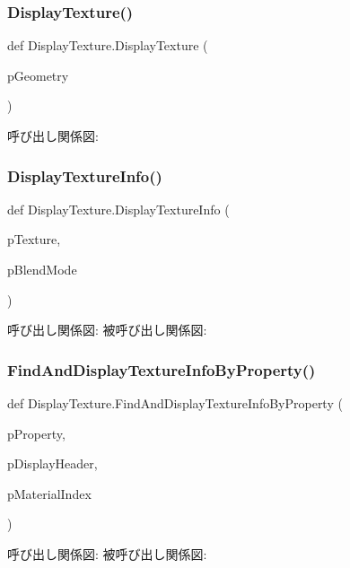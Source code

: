 \subsubsection{\texorpdfstring{Display\+Texture()}{DisplayTexture()}}
{\footnotesize\ttfamily def Display\+Texture.\+Display\+Texture (\begin{DoxyParamCaption}\item[{}]{p\+Geometry }\end{DoxyParamCaption})}

呼び出し関係図\+:
\mbox{\label{namespace_display_texture_ac754509caa833a15e98cbeb4e0b4370b}} 
\subsubsection{\texorpdfstring{Display\+Texture\+Info()}{DisplayTextureInfo()}}
{\footnotesize\ttfamily def Display\+Texture.\+Display\+Texture\+Info (\begin{DoxyParamCaption}\item[{}]{p\+Texture,  }\item[{}]{p\+Blend\+Mode }\end{DoxyParamCaption})}

呼び出し関係図\+:
被呼び出し関係図\+:
\mbox{\label{namespace_display_texture_a14a510f441689b07a9c7582ca3f77b05}} 
\subsubsection{\texorpdfstring{Find\+And\+Display\+Texture\+Info\+By\+Property()}{FindAndDisplayTextureInfoByProperty()}}
{\footnotesize\ttfamily def Display\+Texture.\+Find\+And\+Display\+Texture\+Info\+By\+Property (\begin{DoxyParamCaption}\item[{}]{p\+Property,  }\item[{}]{p\+Display\+Header,  }\item[{}]{p\+Material\+Index }\end{DoxyParamCaption})}

呼び出し関係図\+:
被呼び出し関係図\+:
